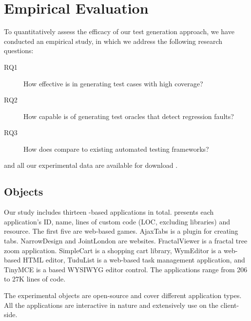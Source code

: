 \section{Empirical Evaluation} \label{Sec:evaluation}

To quantitatively assess the efficacy of our test generation approach, we have conducted an empirical study, in which we address the following research questions:



\begin{description}
\item [RQ1] How effective is \jseft in generating test cases with high coverage? 
\item [RQ2] How capable is \jseft of generating test oracles that detect regression faults?
\item [RQ3] How does \jseft compare to existing automated \javascript testing frameworks?
\end{description} 


\jseft and all our experimental data are available for download \cite{jseft-dl}.



\subsection{Objects}
Our study includes thirteen \javascript-based applications in total. 
 presents each application's ID, name, lines of custom \javascript code (LOC, excluding \javascript libraries) and resource.
The first five are web-based games. AjaxTabs is a \jquery plugin for creating tabs. NarrowDesign and JointLondon are websites. FractalViewer is a fractal tree zoom application. SimpleCart is a  shopping cart library, WymEditor is a web-based HTML editor, Tudu\-List is a web-based task management application, and Tiny\-MCE is a \javascript based WYSIWYG editor control. The applications range from 206 to 27K lines of \javascript code.

The experimental objects are open-source and cover different application types. All the applications are interactive in nature and extensively use \javascript on the client-side. %


